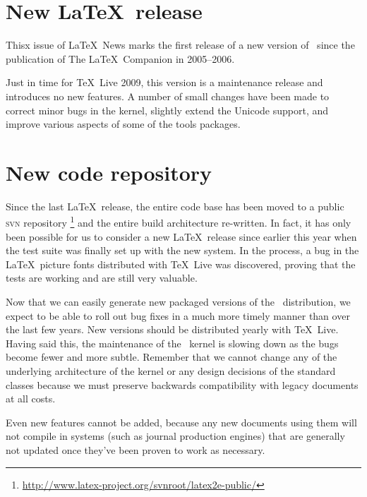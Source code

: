 \documentclass{ltnews}
\begin{document}
\maketitle

\section{New \LaTeX\ release}

Thisx issue of \LaTeX~News marks the first release of a new version of
\LaTeXe\ since the publication of The \LaTeX\ Companion in 2005--2006.

Just in time for \TeX\ Live 2009, this version is a maintenance
release and introduces no new features. A number of small changes have
been made to correct minor bugs in the kernel, slightly extend the Unicode
support, and improve various
aspects of some of the \textsf{tools} packages.

\section{New code repository}

Since the last \LaTeX\ release, the entire code base has been moved
to a public \textsc{svn} repository%
\footnote{\url{http://www.latex-project.org/svnroot/latex2e-public/}}
and the entire build architecture re-written. In fact, it has only
been possible for us to consider a new \LaTeX\ release since earlier
this year when the test suite was finally set up with the new system.
In the process, a bug in the \LaTeX\ picture fonts distributed with
\TeX\ Live was discovered, proving that the
tests are working and are still very valuable.

Now that we can easily generate new packaged versions of the \LaTeXe\
distribution, we expect to be able to roll out bug fixes in a much
more timely manner than over the last few years. New versions should
be distributed yearly with \TeX\ Live. Having said this, the
maintenance of the \LaTeXe\ kernel is slowing down as the bugs become
fewer and more subtle. Remember that we cannot change any of the
underlying architecture of the kernel or any design decisions of the
standard classes because we must preserve backwards compatibility with
legacy documents at all costs.

Even new features cannot be added, because any new documents using
them will not compile in systems (such as journal production engines)
that are generally not updated once they've been proven to work as
necessary.
\end{document}

